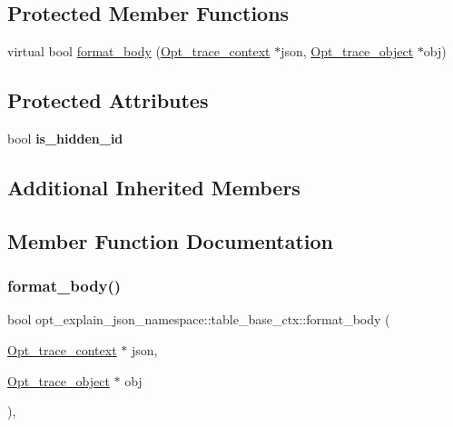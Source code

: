 \subsection*{Protected Member Functions}
\begin{DoxyCompactItemize}
\item 
virtual bool \mbox{\hyperlink{classopt__explain__json__namespace_1_1table__base__ctx_a3b2b6db7328abbca2a584faea135cb31}{format\+\_\+body}} (\mbox{\hyperlink{classOpt__trace__context}{Opt\+\_\+trace\+\_\+context}} $\ast$json, \mbox{\hyperlink{classOpt__trace__object}{Opt\+\_\+trace\+\_\+object}} $\ast$obj)
\end{DoxyCompactItemize}
\subsection*{Protected Attributes}
\begin{DoxyCompactItemize}
\item 
\mbox{\label{classopt__explain__json__namespace_1_1table__base__ctx_a49a75e51ac1b93b24e892133008d2203}} 
bool {\bfseries is\+\_\+hidden\+\_\+id}
\end{DoxyCompactItemize}
\subsection*{Additional Inherited Members}


\subsection{Member Function Documentation}
\mbox{\label{classopt__explain__json__namespace_1_1table__base__ctx_a3b2b6db7328abbca2a584faea135cb31}} 
\subsubsection{\texorpdfstring{format\+\_\+body()}{format\_body()}}
{\footnotesize\ttfamily bool opt\+\_\+explain\+\_\+json\+\_\+namespace\+::table\+\_\+base\+\_\+ctx\+::format\+\_\+body (\begin{DoxyParamCaption}\item[{\mbox{\hyperlink{classOpt__trace__context}{Opt\+\_\+trace\+\_\+context}} $\ast$}]{json,  }\item[{\mbox{\hyperlink{classOpt__trace__object}{Opt\+\_\+trace\+\_\+object}} $\ast$}]{obj }\end{DoxyParamCaption})\hspace{0.3cm}{\ttfamily [protected]}, {\ttfamily [virtual]}}

